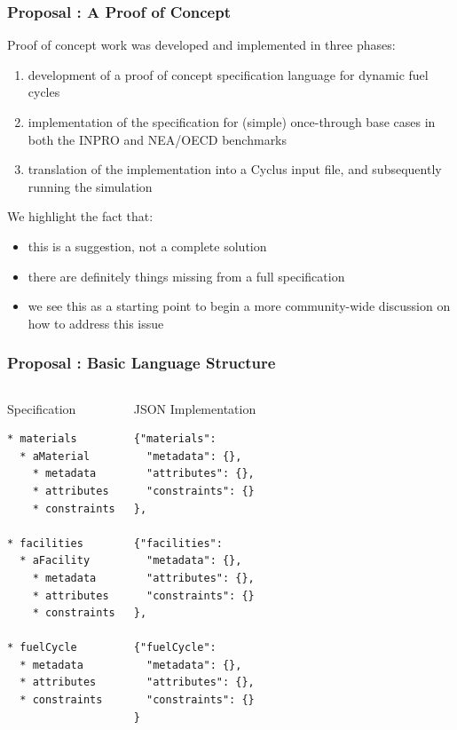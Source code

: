 
\begin{frame}[ctb!]
  \frametitle{Proposal : A Proof of Concept} 

  Proof of concept work was developed and implemented in three phases:

  \begin{enumerate}
    \item development of a proof of concept specification language for dynamic
      fuel cycles
    \item implementation of the specification for (simple) once-through base
      cases in both the INPRO and NEA/OECD benchmarks
    \item translation of the implementation into a Cyclus input file, and
      subsequently running the simulation
  \end{enumerate}

  \pause
  
  We highlight the fact that:

  \begin{itemize}
    \item this is a suggestion, not a complete solution
    \item there are definitely things missing from a full specification
    \item we see this as a starting point to begin a more community-wide
      discussion on how to address this issue
  \end{itemize}
\end{frame}

\begin{frame}[fragile]
  \frametitle{Proposal : Basic Language Structure}
  \begin{columns}[t]
    \begin{block}{Specification}\begin{small}\begin{verbatim}
* materials
  * aMaterial
    * metadata
    * attributes
    * constraints
      
* facilities
  * aFacility
    * metadata
    * attributes
    * constraints
      
* fuelCycle
  * metadata
  * attributes
  * constraints
    \end{verbatim}\end{small}\end{block}
    \begin{block}{JSON Implementation}\begin{small}\begin{verbatim}
{"materials":     
  "metadata": {},
  "attributes": {},
  "constraints": {}
},
      
{"facilities":     
  "metadata": {},
  "attributes": {},
  "constraints": {}
},

{"fuelCycle":     
  "metadata": {},
  "attributes": {},
  "constraints": {}
}
      \end{verbatim}\end{small}\end{block}
  \end{columns}
\end{frame}

